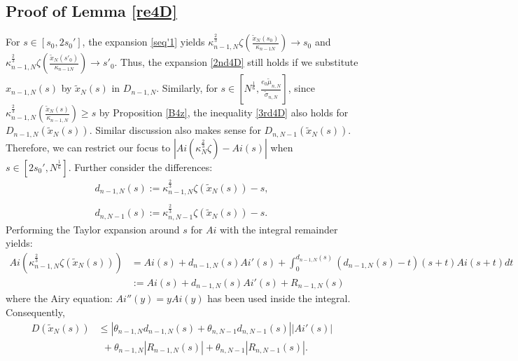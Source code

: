 \documentclass[11pt]{article}
\numberwithin{equation}{section}%
\numberwithin{theorem}{section}
\begin{document}
\subsection{Proof of Lemma \ref{re4D}}\label{P4re4D}
For $s\in[s_0,2s_0']$, the expansion \eqref{seq'1} yields $\kappa_{n-1,N}^\frac{2}{3}\zeta\left(\frac{\tilde{x}_N(s_0)}{\kappa_{n-1N}}\right)\rightarrow s_0$ and $\kappa_{n-1,N}^\frac{2}{3}\zeta\left(\frac{\tilde{x}_N(s'_0)}{\kappa_{n-1N}}\right)\rightarrow s'_0$. Thus, the expansion \eqref{2nd4D} still holds if we substitute $x_{n-1,N}(s)$ by $\tilde{x}_N(s)$ in $D_{n-1,N}$. Similarly, for $s\in\left[N^\frac{1}{6},\frac{e_0\tilde\mu_{n,N}}{\tilde\sigma_{n,N}}\right]$, since $\kappa_{n-1,N}^\frac{2}{3}\left(\frac{\tilde{x}_N(s)}{\kappa_{n-1,N}}\right)\ge s$ by Proposition \ref{B4z}, the inequality \eqref{3rd4D} also holds for $D_{n-1,N}(\tilde{x}_N(s))$. Similar discussion also makes sense for $D_{n,N-1}(\tilde{x}_N(s))$. Therefore, we can restrict our focus to $\left|Ai\left(\kappa_N^\frac{2}{3}\zeta\right)-Ai(s)\right|$ when $s\in\left[2s_0',N^\frac{1}{6}\right]$. Further consider the differences:
\begin{equation*}
    \begin{array}{ll}
        d_{n-1,N}(s):=\kappa_{n-1,N}^\frac{2}{3}\zeta(\tilde{x}_N(s))-s,\\
        \\
        d_{n,N-1}(s):=\kappa_{n,N-1}^\frac{2}{3}\zeta(\tilde{x}_N(s))-s.
    \end{array}
\end{equation*}
Performing the Taylor expansion around $s$ for $Ai$ with the integral remainder yields:
\begin{equation}\label{Taylor4Ai}
    \begin{split}
         Ai\left(\kappa_{n-1,N}^\frac{2}{3}\zeta(\tilde{x}_N(s))\right)&=Ai(s)+d_{n-1,N}(s)Ai'(s)+\int_0^{d_{n-1,N}(s)}(d_{n-1,N}(s)-t)(s+t)Ai(s+t)dt\\
        &:=Ai(s)+d_{n-1,N}(s)Ai'(s)+R_{n-1,N}(s)
    \end{split}
\end{equation}
where the Airy equation: $Ai''(y)=yAi(y)$ has been used inside the integral. Consequently,
\begin{equation}\label{B4D}
\begin{split}
      D(\tilde{x}_N(s))&\le|\theta_{n-1,N}d_{n-1,N}(s)+\theta_{n,N-1}d_{n,N-1}(s)||Ai'(s)|\\
      &~~+\theta_{n-1,N}|R_{n-1,N}(s)|+\theta_{n,N-1}|R_{n,N-1}(s)|.
\end{split}
\end{equation}
\end{document}
